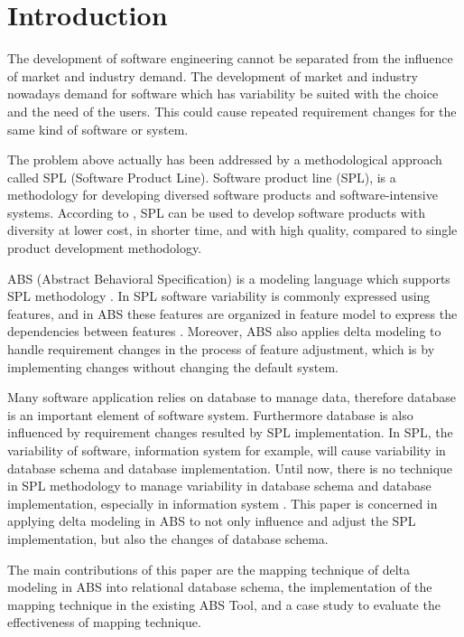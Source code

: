 \documentclass[runningheads,a4paper]{llncs}
\begin{document}
\section{Introduction}

The development of software engineering cannot be separated from the influence of market and industry demand. The development of market and industry nowadays demand for software which has variability be suited with the choice and the need of the users. This could cause repeated requirement changes for the same kind of software or system.

The problem above actually has been addressed by a methodological approach called SPL (Software Product Line). Software product line (SPL), is a methodology for developing diversed software products and software-intensive systems. According to \cite{book1}, SPL can be used to develop software products with diversity at lower cost, in shorter time, and with high quality, compared to single product development methodology.

ABS (Abstract Behavioral Specification) is a modeling language which supports SPL methodology \cite{lncschap}. In SPL software variability is commonly expressed using features, and in ABS these features are organized in feature model to express the dependencies between features \cite{url}. Moreover, ABS also applies delta modeling to handle requirement changes in the process of feature adjustment, which is by implementing changes without changing the default system.

Many software application relies on database to manage data, therefore database is an important element of software system. Furthermore database is also influenced by requirement changes resulted by SPL implementation. In SPL, the variability of software, information system for example, will cause variability in database schema and database implementation. Until now, there is no technique in SPL methodology to manage variability in database schema and database implementation, especially in information system \cite{article}. This paper is concerned in applying delta modeling in ABS to not only influence and adjust the  SPL implementation, but also the changes of database schema.

The main contributions of this paper are the mapping technique of delta modeling in ABS into relational database schema, the implementation of the mapping technique in the existing ABS Tool, and a case study to evaluate the effectiveness of mapping technique. 
\end{document}
